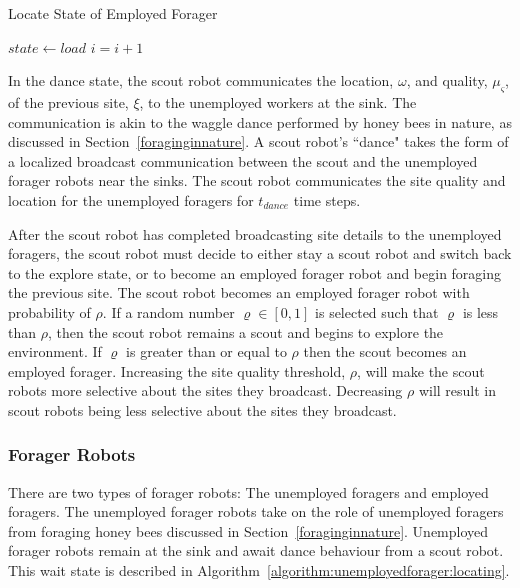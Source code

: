 \documentclass[preprint,12pt]{elsarticle}
\begin{document}
\begin{algorithm}
\caption{Locate State of Employed Forager}
\label{algorithm:employedforager:locating}
\begin{algorithmic}[1]
	\State {}
	\State {}
		\State $state \gets load$
	\EndIf
	\State $i =i + 1$
\EndFunction
\end{algorithmic}
\end{algorithm}

In the dance state, the scout robot communicates the location, $\omega$, and quality, $\mu_\varsigma$, of the previous site, $\xi$, to the unemployed workers at the sink. The communication is akin to the waggle dance performed by honey bees in nature, as discussed in Section~\ref{foraginginnature}. A scout robot's ``dance" takes the form of a localized broadcast communication between the scout and the unemployed forager robots near the sinks. The scout robot communicates the site quality and location for the unemployed foragers for $t_{dance}$ time steps.

After the scout robot has completed broadcasting site details to the unemployed foragers, the scout robot must decide to either stay a scout robot and switch back to the explore state, or to become an employed forager robot and begin foraging the previous site. The scout robot becomes an employed forager robot with probability of $\rho$. If a random number $\varrho\in[0,1]$ is selected such that $\varrho$ is less than $\rho$, then the scout robot remains a scout and begins to explore the environment. If $\varrho$ is greater than or equal to $\rho$ then the scout becomes an employed forager. Increasing the site quality threshold, $\rho$, will make the scout robots more selective about the sites they broadcast. Decreasing $\rho$ will result in scout robots being less selective about the sites they broadcast.

\subsubsection{Forager Robots}
\label{foragerrobots}

There are two types of forager robots: The unemployed foragers and employed foragers. The unemployed forager robots take on the role of unemployed foragers from foraging honey bees discussed in Section~\ref{foraginginnature}. Unemployed forager robots remain at the sink and await dance behaviour from a scout robot. This wait state is described in Algorithm~\ref{algorithm:unemployedforager:locating}.
\end{document}
